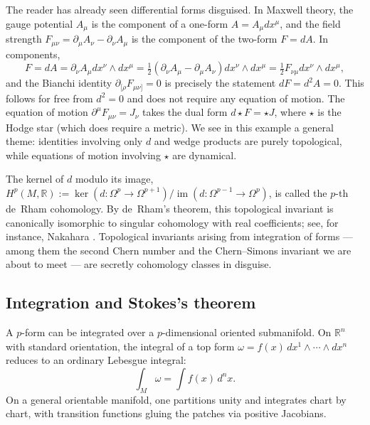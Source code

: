 \documentclass[11pt]{article}
\newcommand{\R}{\mathbb{R}}
\newcommand{\image}{\operatorname{im}}
\newcommand{\kernel}{\operatorname{ker}}
\theoremstyle{definition}
\numberwithin{theorem}{section}
\numberwithin{equation}{section}
\let\del\partial
\begin{document}
\begin{example}\label{ex:em-forms}
The reader has already seen differential forms disguised. In Maxwell theory, the gauge potential $A_\mu$ is the component of a one-form $A = A_\mu dx^\mu$, and the field strength $F_{\mu\nu} = \del_\mu A_\nu - \del_\nu A_\mu$ is the component of the two-form $F = dA$. In components,
\begin{equation*}
F = dA = \del_\nu A_\mu dx^\nu \wedge dx^\mu = \tfrac{1}{2}(\del_\nu A_\mu - \del_\mu A_\nu)dx^\nu\wedge dx^\mu = \tfrac{1}{2}F_{\nu\mu}dx^\nu\wedge dx^\mu,
\end{equation*}
and the Bianchi identity $\del_{[\rho} F_{\mu\nu]} = 0$ is precisely the statement $dF = d^2 A = 0$. This follows for free from $d^2 = 0$ and does not require any equation of motion. The equation of motion $\del^\mu F_{\mu\nu} = J_\nu$ takes the dual form $d\star F = \star J$, where $\star$ is the Hodge star (which does require a metric). We see in this example a general theme: identities involving only $d$ and wedge products are purely topological, while equations of motion involving $\star$ are dynamical.
\end{example}

\begin{example}\label{ex:deRham}
The kernel of $d$ modulo its image, $H^p(M,\R) := \kernel(d:\Omega^p\to\Omega^{p+1})/\image(d:\Omega^{p-1}\to\Omega^p)$, is called the $p$-th de~Rham cohomology. By de~Rham's theorem, this topological invariant is canonically isomorphic to singular cohomology with real coefficients; see, for instance, Nakahara \cite{Nakahara2003GTP}. Topological invariants arising from integration of forms --- among them the second Chern number and the Chern--Simons invariant we are about to meet --- are secretly cohomology classes in disguise.
\end{example}

\subsection{Integration and Stokes's theorem}

A $p$-form can be integrated over a $p$-dimensional oriented submanifold. On $\R^n$ with standard orientation, the integral of a top form $\omega = f(x)\, dx^1\wedge \cdots\wedge dx^n$ reduces to an ordinary Lebesgue integral:
\begin{equation}
\int_M \omega = \int f(x)\, d^n x.
\end{equation}
On a general orientable manifold, one partitions unity and integrates chart by chart, with transition functions gluing the patches via positive Jacobians.
\end{document}

